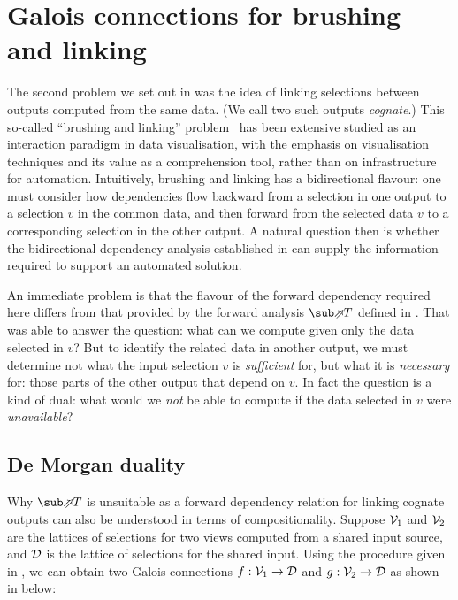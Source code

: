 \section{Galois connections for brushing and linking}
\label{sec:de-morgan}

The second problem we set out in  was the idea of linking selections between outputs computed from the same data. (We call two such outputs \emph{cognate}.) This so-called ``brushing and linking'' problem~\cite{becker87} has been extensive studied as an interaction paradigm in data visualisation, with the emphasis on visualisation techniques and its value as a comprehension tool, rather than on infrastructure for automation. Intuitively, brushing and linking has a bidirectional flavour: one must consider how dependencies flow backward from a selection in one output to a selection $v$ in the common data, and then forward from the selected data $v$ to a corresponding selection in the other output. A natural question then is whether the bidirectional dependency analysis established in  can supply the information required to support an automated solution.

An immediate problem is that the flavour of the forward dependency required here differs from that provided by the forward analysis $\evalFwdF{T}$ defined in . That was able to answer the question: what can we compute given only the data selected in $v$? But to identify the related data in another output, we must determine not what the input selection $v$ is \emph{sufficient} for, but what it is \emph{necessary} for: those parts of the other output that depend on $v$. In fact the question is a kind of dual: what would we \emph{not} be able to compute if the data selected in $v$ were \emph{unavailable}?

\subsection{De Morgan duality}
\label{sec:de-morgan:de-morgan-duality}

Why $\evalFwdF{T}$ is unsuitable as a forward dependency relation for linking cognate outputs can also be understood in terms of compositionality. Suppose $\mathcal{V}_1$ and $\mathcal{V}_2$ are the lattices of selections for two views computed from a shared input source, and $\mathcal{D}$ is the lattice of selections for the shared input. Using the procedure given in , we can obtain two Galois connections $f: \mathcal{V}_1 \to \mathcal{D}$ and $g: \mathcal{V}_2 \to \mathcal{D}$ as shown in  below:

